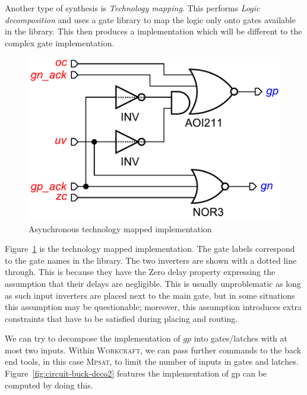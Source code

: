 \documentclass[british,compsoc]{IEEEtran}
\newcommand{\noun}[1]{\textsc{#1}}
\begin{document}
Another type of synthesis is \emph{Technology mapping}.
This performs \emph{Logic decomposition} and uses a gate library to map the logic only onto gates available in the library.
This then produces a implementation which will be different to the complex gate implementation.

\begin{figure}[h]
\begin{centering}
\includegraphics[scale=0.3]{Images/circuit-buck-mapped-pfy-wc.pdf}
\par\end{centering}

\protect\caption{\label{fig:tech-mapped-circuit}Asynchronous technology mapped implementation}
\end{figure}

Figure~\ref{fig:tech-mapped-circuit} is the technology mapped implementation.  The gate labels correspond to the gate names in the library.
The two inverters are shown with a dotted line through. This is because they have the Zero delay property expressing the assumption that their delays are negligible.
This is usually unproblematic as long as such input inverters are placed next to the main gate, but in some situations this assumption may be questionable;
moreover, this assumption introduces extra constraints that have to be satisfied during placing and routing.

We can try to decompose the implementation of $gp$ into gates/latches with at most two inputs. 
Within \noun{Workcraft}, we can pass further commands to the back end tools, in this case \noun{Mpsat}, to limit the number of inputs in gates and latches.
Figure~\ref{fig:circuit-buck-deco2} features the implementation of gp can be computed by doing this.
\end{document}
